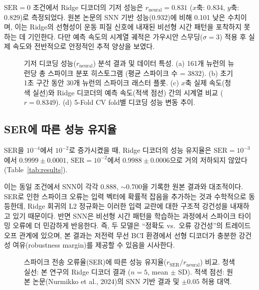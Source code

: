 \documentclass[12pt, a4paper]{article}
\begin{document}
$\text{SER} = 0$ 조건에서 Ridge 디코더의 기저 성능은
$r_{\text{neural}} = 0.831$ ($x$축: 0.834, $y$축: 0.829)로 측정되었다.
원본 논문의 SNN 기반 성능(0.932)에 비해 0.101 낮은 수치이며,
이는 Ridge의 선형성이 운동 피질 신호에 내재된 비선형 시간 패턴을 포착하지 못하는 데 기인한다.
다만 예측 속도의 시계열 궤적은 가우시안 스무딩($\sigma = 3$) 적용 후
실제 속도와 전반적으로 안정적인 추적 양상을 보였다.

\begin{figure}[htbp]
  \centering
  \caption{기저 디코딩 성능($r_{\text{neural}}$) 분석 결과 및 데이터 특성.
    (a) 161개 뉴런의 뉴런당 총 스파이크 분포 히스토그램 (평균 스파이크 수 = 3832).
    (b) 초기 1초 구간 동안 30개 뉴런의 스파이크 래스터 플롯.
    (c) $x$축 실제 속도(청색 실선)와 Ridge 디코더의 예측 속도(적색 점선) 간의 시계열 비교 ($r = 0.8349$).
    (d) 5-Fold CV fold별 디코딩 성능 변동 추이.}
  \label{fig:baseline}
\end{figure}

\subsection{SER에 따른 성능 유지율}

SER을 $10^{-4}$에서 $10^{-2}$로 증가시켰을 때,
Ridge 디코더의 성능 유지율은 $\text{SER} = 10^{-3}$에서 $0.9999 \pm 0.0001$,
$\text{SER} = 10^{-2}$에서 $0.9988 \pm 0.0006$으로 거의 저하되지 않았다
(Table~\ref{tab:results}).

이는 동일 조건에서 SNN이 각각 0.888, $\sim$0.700을 기록한 원본 결과와 대조적이다.
SER로 인한 스파이크 오류는 입력 벡터에 확률적 잡음을 추가하는 것과 수학적으로 동등한데,
Ridge 회귀의 L2 정규화는 이러한 입력 교란에 대한 구조적 강건성을 내재하고 있기 때문이다.
반면 SNN은 비선형 시간 패턴을 학습하는 과정에서 스파이크 타이밍 오류에 더 민감하게 반응한다.
즉, 두 모델은 ``정확도 vs.\ 오류 강건성''의 트레이드오프 관계에 있으며,
본 결과는 저전력 무선 BCI 환경에서 선형 디코더가 충분한 강건성 여유(robustness margin)를
제공할 수 있음을 시사한다.

\begin{figure}[htbp]
  \centering
  \caption{스파이크 전송 오류율(SER)에 따른 성능 유지율($r_{\text{SER}} / r_{\text{neural}}$) 비교.
    청색 실선: 본 연구의 Ridge 디코더 결과 ($n=5$, mean $\pm$ SD).
    적색 점선: 원본 논문(Nurmikko et al., 2024)의 SNN 기반 결과 및 $\pm 0.05$ 허용 대역.}
  \label{fig:ser_retention}
\end{figure}
\end{document}
